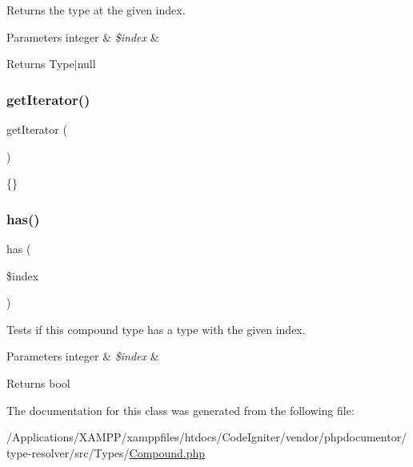 Returns the type at the given index.


\begin{DoxyParams}[1]{Parameters}
integer & {\em \$index} & \\
\hline
\end{DoxyParams}
\begin{DoxyReturn}{Returns}
Type$\vert$null 
\end{DoxyReturn}
\mbox{\label{classphp_documentor_1_1_reflection_1_1_types_1_1_compound_a7a9f937c2958e6f4dd7b030f86fb70b7}} 
\subsubsection{\texorpdfstring{get\+Iterator()}{getIterator()}}
{\footnotesize\ttfamily get\+Iterator (\begin{DoxyParamCaption}{ }\end{DoxyParamCaption})}

\{\} \mbox{\label{classphp_documentor_1_1_reflection_1_1_types_1_1_compound_a709fab8b3056d23e5cf2be3d5c6eda21}} 
\subsubsection{\texorpdfstring{has()}{has()}}
{\footnotesize\ttfamily has (\begin{DoxyParamCaption}\item[{}]{\$index }\end{DoxyParamCaption})}

Tests if this compound type has a type with the given index.


\begin{DoxyParams}[1]{Parameters}
integer & {\em \$index} & \\
\hline
\end{DoxyParams}
\begin{DoxyReturn}{Returns}
bool 
\end{DoxyReturn}


The documentation for this class was generated from the following file\+:\begin{DoxyCompactItemize}
\item 
/\+Applications/\+X\+A\+M\+P\+P/xamppfiles/htdocs/\+Code\+Igniter/vendor/phpdocumentor/type-\/resolver/src/\+Types/\mbox{\hyperlink{_compound_8php}{Compound.\+php}}\end{DoxyCompactItemize}

